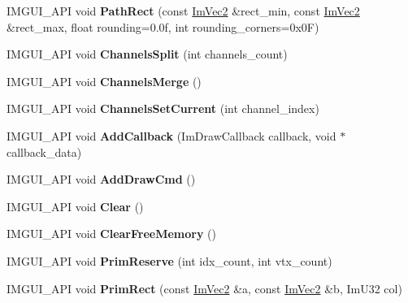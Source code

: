 \begin{DoxyCompactItemize}
I\+M\+G\+U\+I\+\_\+\+A\+PI void {\bfseries Path\+Rect} (const \mbox{\hyperlink{struct_im_vec2}{Im\+Vec2}} \&rect\+\_\+min, const \mbox{\hyperlink{struct_im_vec2}{Im\+Vec2}} \&rect\+\_\+max, float rounding=0.\+0f, int rounding\+\_\+corners=0x0\+F)
\item 
\mbox{\label{struct_im_draw_list_aaab6835f0fb17a79510cbb057ad15cad}} 
I\+M\+G\+U\+I\+\_\+\+A\+PI void {\bfseries Channels\+Split} (int channels\+\_\+count)
\item 
\mbox{\label{struct_im_draw_list_a5296cbc4ba6ccdbfbe62ef6b4fc76468}} 
I\+M\+G\+U\+I\+\_\+\+A\+PI void {\bfseries Channels\+Merge} ()
\item 
\mbox{\label{struct_im_draw_list_a460072bcefc25e5e8052903173de67f5}} 
I\+M\+G\+U\+I\+\_\+\+A\+PI void {\bfseries Channels\+Set\+Current} (int channel\+\_\+index)
\item 
\mbox{\label{struct_im_draw_list_a04e9c88972cde170e257f04cc5cf73c8}} 
I\+M\+G\+U\+I\+\_\+\+A\+PI void {\bfseries Add\+Callback} (Im\+Draw\+Callback callback, void $\ast$callback\+\_\+data)
\item 
\mbox{\label{struct_im_draw_list_a5ad8fac0b8e76be9a7cde77637d6bca2}} 
I\+M\+G\+U\+I\+\_\+\+A\+PI void {\bfseries Add\+Draw\+Cmd} ()
\item 
\mbox{\label{struct_im_draw_list_a611458546f5ceeeef6150376e9f61d44}} 
I\+M\+G\+U\+I\+\_\+\+A\+PI void {\bfseries Clear} ()
\item 
\mbox{\label{struct_im_draw_list_a6edeb43d626c0701341abe7301a79323}} 
I\+M\+G\+U\+I\+\_\+\+A\+PI void {\bfseries Clear\+Free\+Memory} ()
\item 
\mbox{\label{struct_im_draw_list_a507a691f33d12bbfd2b4c16756f4fb31}} 
I\+M\+G\+U\+I\+\_\+\+A\+PI void {\bfseries Prim\+Reserve} (int idx\+\_\+count, int vtx\+\_\+count)
\item 
\mbox{\label{struct_im_draw_list_a30d56ec472ae78be87861358bc81f821}} 
I\+M\+G\+U\+I\+\_\+\+A\+PI void {\bfseries Prim\+Rect} (const \mbox{\hyperlink{struct_im_vec2}{Im\+Vec2}} \&a, const \mbox{\hyperlink{struct_im_vec2}{Im\+Vec2}} \&b, Im\+U32 col)

\end{DoxyCompactItemize}
